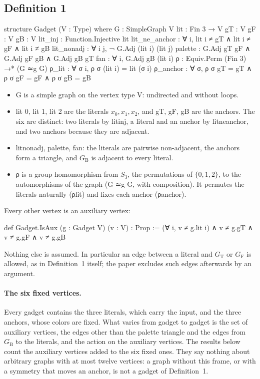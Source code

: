 \documentclass[11pt,a4paper]{article}
\newcommand{\leanus}{\textunderscore\allowbreak}
\newcommand{\lean}[1]{{\ttfamily\let\_\leanus #1}}
\newcommand{\GT}{G_{\mathrm{T}}}
\newcommand{\GF}{G_{\mathrm{F}}}
\newcommand{\GB}{G_{\mathrm{B}}}
\theoremstyle{definition}
\begin{document}
\subsection{Definition 1}
\begin{code}
structure Gadget (V : Type) where
  G : SimpleGraph V
  lit : Fin 3 → V
  gT : V
  gF : V
  gB : V
  lit_inj : Function.Injective lit
  lit_ne_anchor : ∀ i, lit i ≠ gT ∧ lit i ≠ gF ∧ lit i ≠ gB
  lit_nonadj : ∀ i j, ¬ G.Adj (lit i) (lit j)
  palette : G.Adj gT gF ∧ G.Adj gF gB ∧ G.Adj gB gT
  fan : ∀ i, G.Adj gB (lit i)
  ρ : Equiv.Perm (Fin 3) →* (G ≃g G)
  ρ_lit : ∀ σ i, ρ σ (lit i) = lit (σ i)
  ρ_anchor : ∀ σ, ρ σ gT = gT ∧ ρ σ gF = gF ∧ ρ σ gB = gB
\end{code}
\begin{itemize}
\item \lean{G} is a simple graph on the vertex type \lean{V}: undirected and
without loops.
\item \lean{lit 0}, \lean{lit 1}, \lean{lit 2} are the literals $x_0,x_1,x_2$,
and \lean{gT}, \lean{gF}, \lean{gB} are the anchors. The six are distinct:
two literals by \lean{lit\_inj}, a literal and an anchor by
\lean{lit\_ne\_anchor}, and two anchors because they are adjacent.
\item \lean{lit\_nonadj}, \lean{palette}, \lean{fan}: the literals are
pairwise non-adjacent, the anchors form a triangle, and $\GB$ is adjacent to
every literal.
\item \lean{ρ} is a group homomorphism from $S_3$, the permutations of
$\{0,1,2\}$, to the automorphisms of the graph (\lean{G ≃g G}, with
composition). It permutes the literals naturally (\lean{ρ\_lit}) and fixes
each anchor (\lean{ρ\_anchor}).
\end{itemize}
Every other vertex is an auxiliary vertex:
\begin{code}
def Gadget.IsAux (g : Gadget V) (v : V) : Prop :=
  (∀ i, v ≠ g.lit i) ∧ v ≠ g.gT ∧ v ≠ g.gF ∧ v ≠ g.gB
\end{code}
Nothing else is assumed. In particular an edge between a literal and $\GT$
or $\GF$ is allowed, as in Definition~1 itself; the paper excludes such edges
afterwards by an argument.

\paragraph{The six fixed vertices.} Every gadget contains the three
literals, which carry the input, and the three anchors, whose colors are
fixed. What varies from gadget to gadget is the set of auxiliary vertices,
the edges other than the palette triangle and the edges from $\GB$ to the
literals, and the action on the auxiliary vertices. The results below count
the auxiliary vertices added to the six fixed ones. They say nothing about
arbitrary graphs with at most twelve vertices: a graph without this frame,
or with a symmetry that moves an anchor, is not a gadget of Definition~1.
\end{document}
